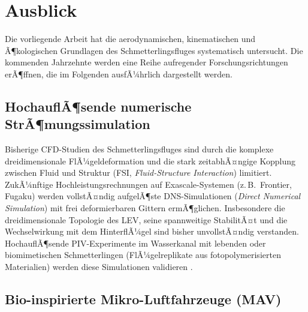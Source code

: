 ﻿\documentclass[a4paper,12pt]{article}
\theoremstyle{definition}
\begin{document}
	\section{Ausblick}
	\label{sec:ausblick}
	
	Die vorliegende Arbeit hat die aerodynamischen, kinematischen und Ã¶kologischen
	Grundlagen des Schmetterlingsfluges systematisch untersucht.
	Die kommenden Jahrzehnte werden eine Reihe aufregender Forschungsrichtungen erÃ¶ffnen,
	die im Folgenden ausfÃ¼hrlich dargestellt werden.
	
	\subsection{HochauflÃ¶sende numerische StrÃ¶mungssimulation}
	
	Bisherige CFD-Studien des Schmetterlingsfluges sind durch die komplexe
	dreidimensionale FlÃ¼geldeformation und die stark zeitabhÃ¤ngige Kopplung zwischen
	Fluid und Struktur (FSI, \textit{Fluid-Structure Interaction}) limitiert.
	ZukÃ¼nftige Hochleistungsrechnungen auf Exascale-Systemen
	(z.\,B.\ Frontier, Fugaku) werden vollstÃ¤ndig aufgelÃ¶ste DNS-Simulationen
	(\textit{Direct Numerical Simulation}) mit frei deformierbaren Gittern ermÃ¶glichen.
	Insbesondere die dreidimensionale Topologie des LEV, seine spannweitige StabilitÃ¤t
	und die Wechselwirkung mit dem HinterflÃ¼gel sind bisher unvollstÃ¤ndig verstanden.
	HochauflÃ¶sende PIV-Experimente im Wasserkanal mit lebenden oder
	biomimetischen Schmetterlingen (FlÃ¼gelreplikate aus fotopolymerisierten
	Materialien) werden diese Simulationen validieren \cite{bomphrey2017smart}.
	
	\subsection{Bio-inspirierte Mikro-Luftfahrzeuge (MAV)}
	
\end{document}
